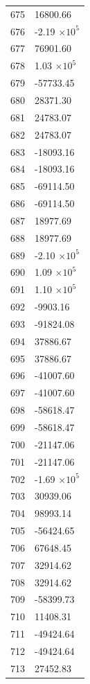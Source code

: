 \documentclass[a4paper,11pt]{article}
\begin{document}
\begin{center}
\begin{longtable}{|R{1.5cm}|R{2.5cm}|}
  675 &     16800.66 \\
  676 &        -2.19 $\times 10^{           5}$ \\
  677 &     76901.60 \\
  678 &         1.03 $\times 10^{           5}$ \\
  679 &    -57733.45 \\
  680 &     28371.30 \\
  681 &     24783.07 \\
  682 &     24783.07 \\
  683 &    -18093.16 \\
  684 &    -18093.16 \\
  685 &    -69114.50 \\
  686 &    -69114.50 \\
  687 &     18977.69 \\
  688 &     18977.69 \\
  689 &        -2.10 $\times 10^{           5}$ \\
  690 &         1.09 $\times 10^{           5}$ \\
  691 &         1.10 $\times 10^{           5}$ \\
  692 &     -9903.16 \\
  693 &    -91824.08 \\
  694 &     37886.67 \\
  695 &     37886.67 \\
  696 &    -41007.60 \\
  697 &    -41007.60 \\
  698 &    -58618.47 \\
  699 &    -58618.47 \\
  700 &    -21147.06 \\
  701 &    -21147.06 \\
  702 &        -1.69 $\times 10^{           5}$ \\
  703 &     30939.06 \\
  704 &     98993.14 \\
  705 &    -56424.65 \\
  706 &     67648.45 \\
  707 &     32914.62 \\
  708 &     32914.62 \\
  709 &    -58399.73 \\
  710 &     11408.31 \\
  711 &    -49424.64 \\
  712 &    -49424.64 \\
  713 &     27452.83 \\

\end{longtable}
\end{center}
\end{document}
